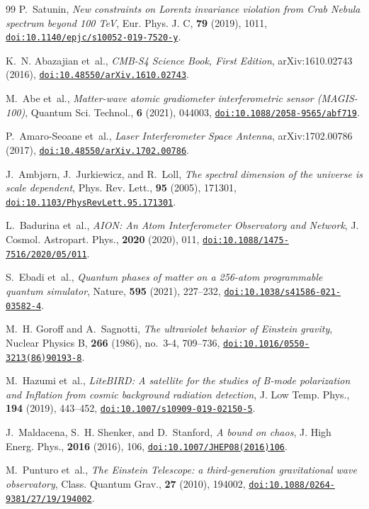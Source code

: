 \documentclass[aps,prl,reprint,twocolumn,superscriptaddress,nofootinbib,floatfix]{revtex4-2}
\providecommand{\doi}[1]{\href{https://doi.org/#1}{\nolinkurl{doi:#1}}}
\begin{document}
\begin{thebibliography}{99}
P.~Satunin,
\emph{New constraints on Lorentz invariance violation from Crab Nebula spectrum beyond 100 TeV},
Eur. Phys. J. C, \textbf{79} (2019), 1011,
\doi{10.1140/epjc/s10052-019-7520-y}.

K.~N. Abazajian et~al.,
\emph{CMB-S4 Science Book, First Edition},
arXiv:1610.02743 (2016),
\doi{10.48550/arXiv.1610.02743}.

M.~Abe et~al.,
\emph{Matter-wave atomic gradiometer interferometric sensor (MAGIS-100)},
Quantum Sci. Technol., \textbf{6} (2021), 044003,
\doi{10.1088/2058-9565/abf719}.

P.~Amaro-Seoane et~al.,
\emph{Laser Interferometer Space Antenna},
arXiv:1702.00786 (2017),
\doi{10.48550/arXiv.1702.00786}.

J.~Ambj{\o}rn, J.~Jurkiewicz, and R.~Loll,
\emph{The spectral dimension of the universe is scale dependent},
Phys. Rev. Lett., \textbf{95} (2005), 171301,
\doi{10.1103/PhysRevLett.95.171301}.

L.~Badurina et~al.,
\emph{AION: An Atom Interferometer Observatory and Network},
J. Cosmol. Astropart. Phys., \textbf{2020} (2020), 011,
\doi{10.1088/1475-7516/2020/05/011}.

S.~Ebadi et~al.,
\emph{Quantum phases of matter on a 256-atom programmable quantum simulator},
Nature, \textbf{595} (2021), 227--232,
\doi{10.1038/s41586-021-03582-4}.

M.~H. Goroff and A.~Sagnotti,
\emph{The ultraviolet behavior of Einstein gravity},
Nuclear Physics B, \textbf{266} (1986), no.~3-4, 709--736,
\doi{10.1016/0550-3213(86)90193-8}.

M.~Hazumi et~al.,
\emph{LiteBIRD: A satellite for the studies of B-mode polarization and Inflation from cosmic background radiation detection},
J. Low Temp. Phys., \textbf{194} (2019), 443--452,
\doi{10.1007/s10909-019-02150-5}.

J.~Maldacena, S.~H. Shenker, and D.~Stanford,
\emph{A bound on chaos},
J. High Energ. Phys., \textbf{2016} (2016), 106,
\doi{10.1007/JHEP08(2016)106}.

M.~Punturo et~al.,
\emph{The Einstein Telescope: a third-generation gravitational wave observatory},
Class. Quantum Grav., \textbf{27} (2010), 194002,
\doi{10.1088/0264-9381/27/19/194002}.


\end{thebibliography}
\end{document}
